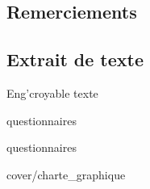 \documentclass[a4paper,11pt,twoside]{article}
\date{\today}
\begin{document}
\dosecttoc{} %


\thispagestyle{empty} %
\subsection*{Remerciements}

\clearpage


\thispagestyle{empty} %
\setcounter{secnumdepth}{3}
\tableofcontents
\clearpage


\setcounter{page}{1}





\clearpage
\appendix
\renewcommand{\stctitle}{}                          %
\renewcommand\thesubsection{A\arabic{subsection}}   %
\renewcommand{\stcSSfont}{}                         %
\secttoc


\clearpage
{}

\subsection{Extrait de texte}

Eng'croyable texte

\clearpage



{questionnaires}
\clearpage



{questionnaires}
\clearpage


{cover/charte_graphique}

\end{document}
